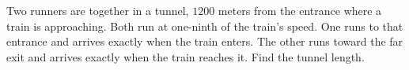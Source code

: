 Two runners are together in a tunnel, $1200$ meters from the entrance where a train is approaching. Both run at one-ninth of the train's speed. One runs to that entrance and arrives exactly when the train enters. The other runs toward the far exit and arrives exactly when the train reaches it. Find the tunnel length.
